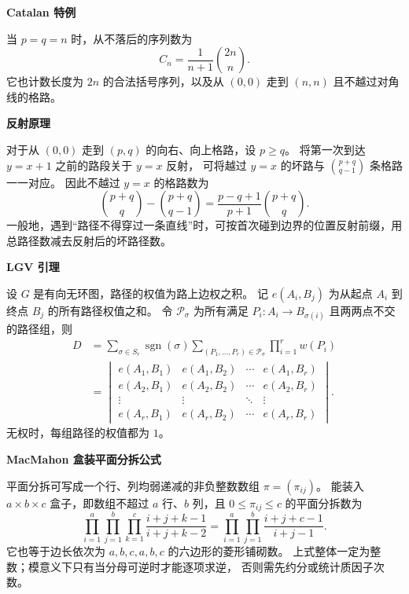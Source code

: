 \textbf{Catalan 特例}

当 $p=q=n$ 时，从不落后的序列数为
\[
  C_n=\frac{1}{n+1}\binom{2n}{n}.
\]
它也计数长度为 $2n$ 的合法括号序列，以及从 $(0,0)$ 走到 $(n,n)$ 且不越过对角线的格路。

\textbf{反射原理}

对于从 $(0,0)$ 走到 $(p,q)$ 的向右、向上格路，设 $p\ge q$。
将第一次到达 $y=x+1$ 之前的路段关于 $y=x$ 反射，
可将越过 $y=x$ 的坏路与 $\binom{p+q}{q-1}$ 条格路一一对应。
因此不越过 $y=x$ 的格路数为
\[
  \binom{p+q}{q}-\binom{p+q}{q-1}
  =\frac{p-q+1}{p+1}\binom{p+q}{q}.
\]
一般地，遇到“路径不得穿过一条直线”时，可按首次碰到边界的位置反射前缀，用总路径数减去反射后的坏路径数。

\textbf{LGV 引理}

设 $G$ 是有向无环图，路径的权值为路上边权之积。
记 $e(A_i,B_j)$ 为从起点 $A_i$ 到终点 $B_j$ 的所有路径权值之和。
令 $\mathcal P_\sigma$ 为所有满足 $P_i:A_i\to B_{\sigma(i)}$ 且两两点不交的路径组，则
\[
  \begin{aligned}
    D
    &=\sum_{\sigma\in S_r}\operatorname{sgn}(\sigma)
      \sum_{(P_1,\ldots,P_r)\in\mathcal P_\sigma}
      \prod_{i=1}^{r}w(P_i)\\
    &=
    \begin{vmatrix}
      e(A_1,B_1) & e(A_1,B_2) & \cdots & e(A_1,B_r)\\
      e(A_2,B_1) & e(A_2,B_2) & \cdots & e(A_2,B_r)\\
      \vdots & \vdots & \ddots & \vdots\\
      e(A_r,B_1) & e(A_r,B_2) & \cdots & e(A_r,B_r)
    \end{vmatrix}.
  \end{aligned}
\]
无权时，每组路径的权值都为 $1$。

\textbf{MacMahon 盒装平面分拆公式}

平面分拆可写成一个行、列均弱递减的非负整数数组
$\pi=(\pi_{ij})$。
能装入 $a\times b\times c$ 盒子，即数组不超过 $a$ 行、$b$ 列，且
$0\le\pi_{ij}\le c$ 的平面分拆数为
\[
  \prod_{i=1}^{a}\prod_{j=1}^{b}\prod_{k=1}^{c}
  \frac{i+j+k-1}{i+j+k-2}
  =\prod_{i=1}^{a}\prod_{j=1}^{b}
  \frac{i+j+c-1}{i+j-1}.
\]
它也等于边长依次为 $a,b,c,a,b,c$ 的六边形的菱形铺砌数。
上式整体一定为整数；模意义下只有当分母可逆时才能逐项求逆，
否则需先约分或统计质因子次数。
